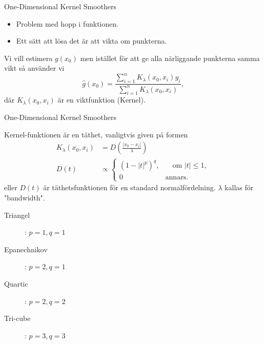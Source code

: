 \documentclass[10pt,english]{beamer}
\begin{document}
\begin{frame}{One-Dimensional Kernel Smoothers}

    \begin{itemize}
        \item Problem med hopp i funktionen.
        \item Ett sätt att lösa det är att vikta om punkterna.
    \end{itemize}

    Vi vill estimera $g(x_0)$ men istället för att ge alla närliggande punkterna samma vikt så använder vi
    \begin{equation*}
        \hat{g}(x_0) = \frac{\sum_{i=1}^{n} K_{\lambda}(x_0, x_i) y_i}{\sum_{i=1}^{n}K_{\lambda}(x_0, x_i)},
    \end{equation*}
    där $K_{\lambda}(x_0, x_i)$ är en viktfunktion (Kernel).
\end{frame}

\begin{frame}{One-Dimensional Kernel Smoothers}
    
    Kernel-funktionen är en täthet, vanligtvis given på formen
    \begin{align*}
        K_{\lambda} (x_0, x_i) &= D\left(\frac{|x_0 - x_i|}{\lambda}\right) \\
        D(t) &\propto \begin{cases}
            (1 - |t|^p)^q,& \quad \text{om } |t| \leq 1, \\
            0& \text{annars.}
        \end{cases}
    \end{align*}
    eller $D(t)$ är täthetsfunktionen för en standard normalfördelning. $\lambda$ kallas för "bandwidth".

    \begin{description}
        \item[Triangel] : $p = 1, q = 1$
        \item[Epanechnikov] : $p = 2, q = 1$
        \item[Quartic] : $p = 2, q = 2$ 
        \item[Tri-cube] : $p = 3, q = 3$  
    \end{description}
    

\end{frame}
\end{document}
